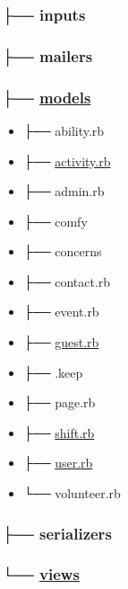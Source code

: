 \documentclass[11pt]{article}
\begin{document}
\subsubsection*{├── inputs}
\label{sec-1-1-5}
\subsubsection*{├── mailers}
\label{sec-1-1-6}
\subsubsection*{├── \href{./app/models}{models}}
\label{sec-1-1-7}

\begin{itemize}
\item ├── ability.rb
\label{sec-1-1-7-1}
\item ├── \href{./app/models/activity.rb}{activity.rb}
\label{sec-1-1-7-2}
\item ├── admin.rb
\label{sec-1-1-7-3}
\item ├── comfy
\label{sec-1-1-7-4}
\item ├── concerns
\label{sec-1-1-7-5}
\item ├── contact.rb
\label{sec-1-1-7-6}
\item ├── event.rb
\label{sec-1-1-7-7}
\item ├── \href{./app/models/guest.rb}{guest.rb}
\label{sec-1-1-7-8}
\item ├── .keep
\label{sec-1-1-7-9}
\item ├── page.rb
\label{sec-1-1-7-10}
\item ├── \href{./app/models/shift.rb}{shift.rb}
\label{sec-1-1-7-11}
\item ├── \href{./app/models/user.rb}{user.rb}
\label{sec-1-1-7-12}
\item └── volunteer.rb
\label{sec-1-1-7-13}
\end{itemize}

\subsubsection*{├── serializers}
\label{sec-1-1-8}
\subsubsection*{└── \href{./app/views}{views}}
\label{sec-1-1-9}
\end{document}
